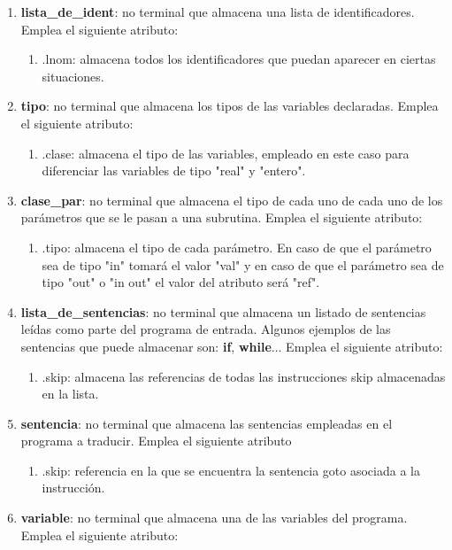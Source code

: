 \documentclass[12pt,a4paper, landscape]{article}
\theoremstyle{mytheor}
\begin{document}
\begin{enumerate}
  \item \textbf{lista\_de\_ident}: no terminal que almacena una lista de identificadores. Emplea el siguiente atributo:
  \begin{enumerate}
    \item .lnom: almacena todos los identificadores que puedan aparecer en ciertas situaciones.
  \end{enumerate}
  \item \textbf{tipo}: no terminal que almacena los tipos de las variables declaradas. Emplea el siguiente atributo:
  \begin{enumerate}
    \item .clase: almacena el tipo de las variables, empleado en este caso para diferenciar las variables de tipo "real" y "entero".
  \end{enumerate}
  \item \textbf{clase\_par}: no terminal que almacena el tipo de cada uno de cada uno de los parámetros que se le pasan a una subrutina. Emplea el siguiente atributo:
  \begin{enumerate}
    \item .tipo: almacena el tipo de cada parámetro. En caso de que el parámetro sea de tipo "in" tomará el valor "val" y en caso de que el parámetro sea de tipo "out" o "in out" el valor del atributo será "ref".
  \end{enumerate}
  \item \textbf{lista\_de\_sentencias}: no terminal que almacena un listado de sentencias leídas como parte del programa de entrada. Algunos ejemplos de las sentencias que puede almacenar son: \textbf{if}, \textbf{while}... Emplea el siguiente atributo:
  \begin{enumerate}
    \item .skip: almacena las referencias de todas las instrucciones skip almacenadas en la lista.
  \end{enumerate}
  \item \textbf{sentencia}: no terminal que almacena las sentencias empleadas en el programa a traducir. Emplea el siguiente atributo
  \begin{enumerate}
    \item .skip: referencia en la que se encuentra la sentencia goto asociada a la instrucción.
  \end{enumerate}
  \item \textbf{variable}: no terminal que almacena una de las variables del programa. Emplea el siguiente atributo:

\end{enumerate}
\end{document}
